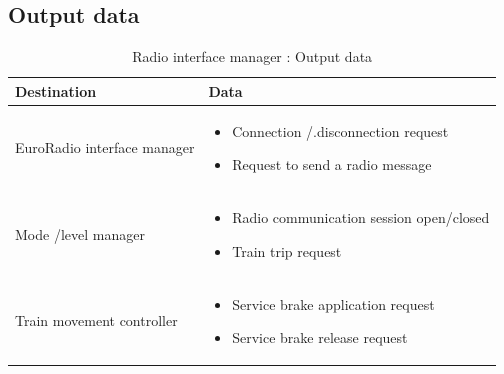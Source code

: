 \documentclass[nocc]{template/openetcs_report}
\begin{document}
\subsection{Output data}
			\begin{longtable}{|l|l|}
				\caption{Radio interface manager : Output data}\\ 
				\hline
				
					\begin{minipage}[t]{0.35\linewidth} \textbf{Destination}	\end{minipage} 
				&	\begin{minipage}[t]{0.65\linewidth} \textbf{Data} \end{minipage} \\
				
				\hline
																																									
					\begin{minipage}[t]{0.35\linewidth} EuroRadio interface manager	\end{minipage} 
				&	\begin{minipage}[t]{0.65\linewidth}
						\begin{itemize}
							\item Connection /.disconnection request
							\item Request to send a radio message
						\end{itemize}
					\end{minipage} \\
				
				\hline
				
					\begin{minipage}[t]{0.35\linewidth} Mode /level manager	\end{minipage} 
				&	\begin{minipage}[t]{0.65\linewidth}
						\begin{itemize}
							\item Radio communication session open/closed
							\item Train trip request
						\end{itemize}			
					\end{minipage} \\
				
				\hline	
				
					\begin{minipage}[t]{0.35\linewidth} Train movement controller	\end{minipage} 
				&	\begin{minipage}[t]{0.65\linewidth}
						\begin{itemize}
							\item Service brake application request
							\item Service brake release request
						\end{itemize}			
					\end{minipage} \\
				

\end{longtable}
\end{document}
